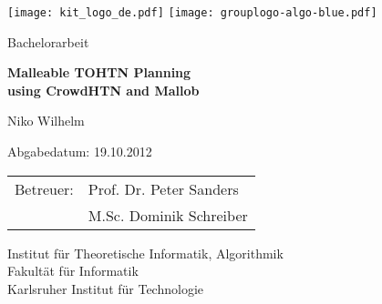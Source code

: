 \documentclass[12pt,a4paper,twoside]{scrartcl}
\numberwithin{equation}{section}
\begin{document}

\pagestyle{empty} %

\begin{titlepage}

  \begin{center}\large

    \quad\texttt{[image: kit\_logo\_de.pdf]} \hfill
    \texttt{[image: grouplogo-algo-blue.pdf]}\quad\null

    \vfill

    Bachelorarbeit
    \vspace*{2cm}

    {\bf\huge Malleable TOHTN Planning \\using CrowdHTN and Mallob \par}

    \vfill

    Niko Wilhelm

    \vspace*{15mm}

    Abgabedatum: 19.10.2012

    \vspace*{45mm}

    \begin{tabular}{rl}
      Betreuer: & Prof. Dr. Peter Sanders \\
      & M.Sc. Dominik Schreiber \\
    \end{tabular}
    
    \vspace*{10mm}

    Institut für Theoretische Informatik, Algorithmik \\
    Fakultät für Informatik \\
    Karlsruher Institut für Technologie


    \vspace*{12mm}
  \end{center}

\end{titlepage}
\end{document}
